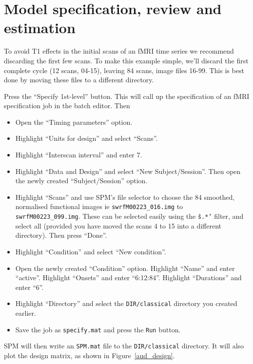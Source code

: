 \section{Model specification, review and estimation}

To avoid T1 effects in the initial scans of an fMRI time series we recommend discarding the first few scans. To make this example simple, we'll discard the first complete cycle (12 scans, 04-15), leaving 84 scans, image files 16-99. This is best done by moving these files to a different directory.

Press the ``Specify 1st-level'' button. This will call up the specification of an fMRI specification job in the batch editor. Then

\begin{itemize}
\item Open the ``Timing parameters'' option.
\item Highlight ``Units for design'' and select ``Scans''.
\item Highlight ``Interscan interval'' and enter 7.
\item Highlight ``Data and Design'' and select ``New Subject/Session''. Then open the newly created ``Subject/Session'' option.
\item Highlight ``Scans'' and use SPM's file selector to choose the 84 smoothed, normalised functional images ie  \texttt{swrfM00223\_016.img} to \texttt{swrfM00223\_099.img}. These can be selected easily using the \texttt{\^s.*'} filter, and select all (provided you have moved the scans 4 to 15 into a different directory). Then press ``Done''.
\item Highlight ``Condition'' and select ``New condition''.
\item Open the newly created ``Condition'' option. Highlight ``Name'' and enter ``active''. Highlight ``Onsets'' and enter ``6:12:84''. Highlight ``Durations'' and enter ``6''.
\item Highlight ``Directory'' and select the \texttt{DIR/classical} directory you created earlier.
\item Save the job as \texttt{specify.mat} and press the \texttt{Run} button.
\end{itemize}

SPM will then write an \texttt{SPM.mat} file to the \texttt{DIR/classical} directory. It will also plot the design matrix, as shown in Figure~\ref{aud_design}. 

